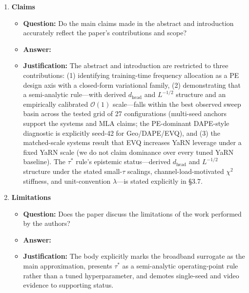 \documentclass{article}
\begin{document}
\begin{enumerate}
\item \textbf{Claims}
\begin{itemize}
\item \textbf{Question:} Do the main claims made in the abstract and introduction accurately reflect the paper's contributions and scope?
\item \textbf{Answer:} \answerYes{}
\item \textbf{Justification:} The abstract and introduction are restricted to three contributions: (1) identifying training-time frequency allocation as a PE design axis with a closed-form variational family, (2) demonstrating that a semi-analytic rule---with derived $d_{\mathrm{head}}$ and $L^{-1/2}$ structure and an empirically calibrated $\mathcal{O}(1)$ scale---falls within the best observed sweep basin across the tested grid of 27 configurations (multi-seed anchors support the systems and MLA claims; the PE-dominant DAPE-style diagnostic is explicitly seed-42 for Geo/DAPE/EVQ), and (3) the matched-scale systems result that EVQ increases YaRN leverage under a fixed YaRN scale (we do not claim dominance over every tuned YaRN baseline). The $\tau^*$ rule's epistemic status---derived $d_{\mathrm{head}}$ and $L^{-1/2}$ structure under the stated small-$\tau$ scalings, channel-load-motivated $\chi^2$ stiffness, and unit-convention $\lambda$---is stated explicitly in \S3.7.
\end{itemize}

\item \textbf{Limitations}
\begin{itemize}
\item \textbf{Question:} Does the paper discuss the limitations of the work performed by the authors?
\item \textbf{Answer:} \answerYes{}
\item \textbf{Justification:} The body explicitly marks the broadband surrogate as the main approximation, presents \(\tau^*\) as a semi-analytic operating-point rule rather than a tuned hyperparameter, and demotes single-seed and video evidence to supporting status.
\end{itemize}


\end{enumerate}
\end{document}
